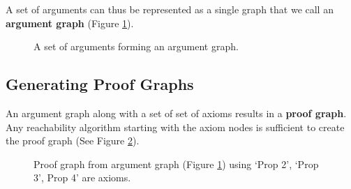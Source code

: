 \documentclass[a4paper]{article}
\begin{document}
A set of arguments can thus be represented as a single graph that we call an \textbf{argument graph} (Figure \ref{argument_graph}).

\begin{figure}[htbp]
\begin{center}
\caption{A set of arguments forming an argument graph.}
\label{argument_graph}
\end{center}
\end{figure}


\subsection{Generating Proof Graphs}
An argument graph along with a set of set of axioms results in a \textbf{proof graph}. Any reachability algorithm starting with the axiom nodes is sufficient to create the proof graph (See Figure \ref{proof_graph1}).


\begin{figure}[htbp]
\begin{center}
\caption{Proof graph from argument graph (Figure \ref{argument_graph}) using `Prop 2', `Prop 3', Prop 4' are axioms.}
\label{proof_graph1}
\end{center}
\end{figure}
\end{document}
